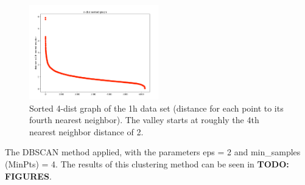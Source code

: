 \begin{figure}[h]
  \centering
  \includegraphics[width=0.5\textwidth]{./images/kDistGraphDBSCAN3h.png}
  \caption{Sorted 4-dist graph of the 1h data set (distance for each point to its fourth nearest neighbor). The valley starts at roughly the 4th nearest neighbor distance of 2.}
  \label{figure:kDistGraphDBSCAN3h}
\end{figure}

The DBSCAN method applied, with the parameters eps = 2 and min\_samples (MinPts) = 4.  The results of this clustering method can be seen in \textbf{TODO: FIGURES}.






  
